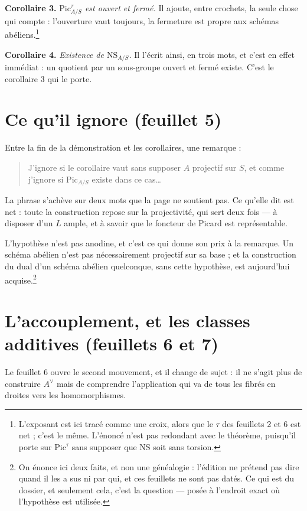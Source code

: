 \documentclass[11pt,a4paper]{article}
\begin{document}
\textbf{Corollaire 3.} \emph{$\mathrm{Pic}^{\tau}_{A/S}$ est ouvert et
\emph{fermé}.} Il ajoute, entre crochets, la seule chose qui compte :
l'ouverture vaut toujours, la fermeture est propre aux schémas
abéliens.\footnote{L'exposant est ici tracé comme une croix, alors que le
$\tau$ des feuillets 2 et 6 est net ; c'est le même. L'énoncé n'est pas
redondant avec le théorème, puisqu'il porte sur $\mathrm{Pic}^{\tau}$ sans
supposer que $\mathrm{NS}$ soit sans torsion.}

\textbf{Corollaire 4.} \emph{Existence de $\mathrm{NS}_{A/S}$.} Il l'écrit
ainsi, en trois mots, et c'est en effet immédiat : un quotient par un
sous-groupe ouvert et fermé existe. C'est le corollaire 3 qui le porte.

\section*{Ce qu'il ignore (feuillet 5)}

Entre la fin de la démonstration et les corollaires, une remarque :

\begin{quote}
J'ignore si le corollaire vaut sans supposer $A$ projectif sur $S$, et comme
j'ignore si $\mathrm{Pic}_{A/S}$ existe dans ce cas\ldots
\end{quote}

La phrase s'achève sur deux mots que la page ne soutient pas. Ce qu'elle dit
est net : toute la construction repose sur la projectivité, qui sert deux
fois — à disposer d'un $L$ ample, et à savoir que le foncteur de Picard est
représentable.

L'hypothèse n'est pas anodine, et c'est ce qui donne son prix à la remarque.
Un schéma abélien n'est pas nécessairement projectif sur sa base ; et la
construction du dual d'un schéma abélien quelconque, sans cette hypothèse,
est aujourd'hui acquise.\footnote{On énonce ici deux faits, et non une
généalogie : l'édition ne prétend pas dire quand il les a sus ni par qui, et
ces feuillets ne sont pas datés. Ce qui est du dossier, et seulement cela,
c'est la question — posée à l'endroit exact où l'hypothèse est utilisée.}

\section*{L'accouplement, et les classes additives (feuillets 6 et 7)}

Le feuillet 6 ouvre le second mouvement, et il change de sujet : il ne s'agit
plus de construire $A^{\vee}$ mais de comprendre l'application qui va de tous
les fibrés en droites vers les homomorphismes.
\end{document}
